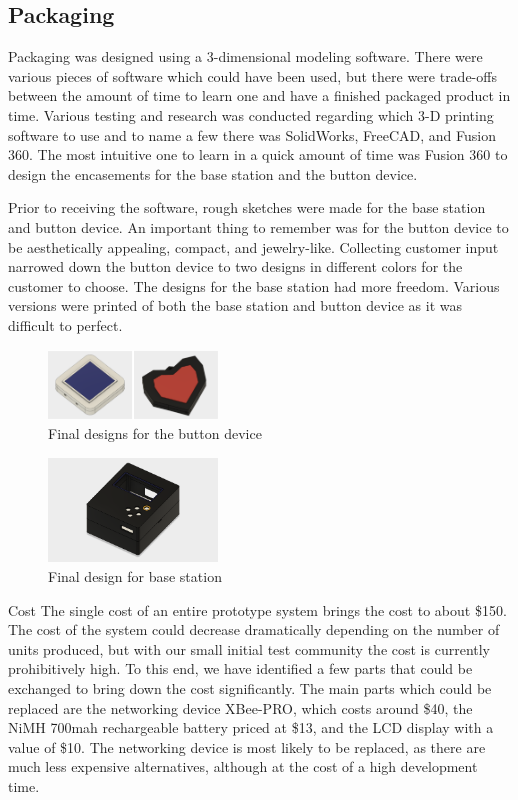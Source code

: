 \documentclass[journal,compsoc]{IEEEtran}
\begin{document}
\subsection{Packaging}
Packaging was designed using a 3-dimensional modeling software. There were various pieces of software which could have been used, but there were trade-offs between the amount of time to learn one and have a finished packaged product in time. Various testing and research was conducted regarding which 3-D printing software to use and to name a few there was SolidWorks, FreeCAD, and Fusion 360. The most intuitive one to learn in a quick amount of time was Fusion 360 to design the encasements for the base station and the button device. 

Prior to receiving the software, rough sketches were made for the base station and button device. An important thing to remember was for the button device to be aesthetically appealing, compact, and jewelry-like. Collecting customer input narrowed down the button device to two designs in different colors for the customer to choose.  The designs for the base station had more freedom. Various versions were printed of both the base station and button device as it was difficult to perfect.

\begin{figure}[ht] 	%
\centering
\includegraphics[width=0.4\textwidth]{Buttons.PNG}
\caption{Final designs for the button device}
\label{Ha-Ha Heart Buttons}
\end{figure}

\begin{figure}[ht] 	%
\centering
\includegraphics[width=0.4\textwidth]{Base.png}
\caption{Final design for base station}
\label{Ha-Ha Base Station}
\end{figure}

Cost\newline
The single cost of an entire prototype system brings the cost to about \$150. The cost of the system could decrease dramatically depending on the number of units produced, but with our small initial test community the cost is currently prohibitively high. To this end, we have identified a few parts that could be exchanged to bring down the cost significantly.
The main parts which could be replaced are the networking device  XBee-PRO, which costs around \$40, the NiMH 700mah rechargeable battery priced at \$13, and the LCD display with a value of \$10. The networking device is most likely to be replaced, as there are much less expensive alternatives, although at the cost of a high development time.
\end{document}
